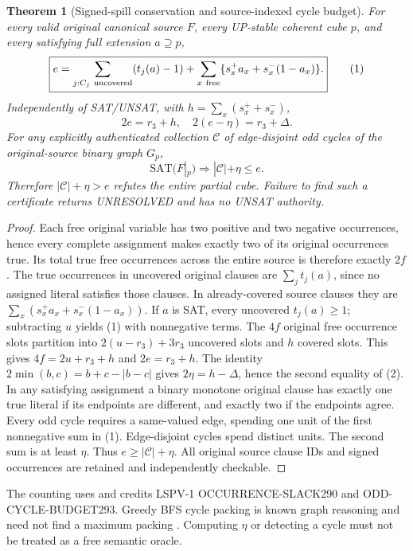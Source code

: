 \documentclass[11pt]{article}
\newtheorem{theorem}{Theorem}
\begin{document}
\begin{theorem}[Signed-spill conservation and source-indexed cycle budget]
For every valid original canonical source $F$, every UP-stable coherent cube $p$, and every satisfying full extension $a\supseteq p$,
\[
\boxed{e=\sum_{j:C_j\ {\rm uncovered}}(t_j(a)-1)
+\sum_{x\ {\rm free}}\{s_x^+a_x+s_x^-(1-a_x)\}.}\tag{1}
\]
Independently of SAT/UNSAT, with $h=\sum_x(s_x^++s_x^-)$,
\[
\boxed{2e=r_3+h,\quad 2(e-\eta)=r_3+\Delta.}\tag{2}
\]
For any explicitly authenticated collection $\mathcal C$ of edge-disjoint odd cycles of the original-source binary graph $G_p$,
\[
\boxed{\mathrm{SAT}(F|_p)\Longrightarrow |\mathcal C|+\eta\le e.}\tag{3}
\]
Therefore $|\mathcal C|+\eta>e$ refutes the entire partial cube. Failure to find such a certificate returns UNRESOLVED and has no UNSAT authority.
\end{theorem}
\begin{proof}
Each free original variable has two positive and two negative occurrences, hence every complete assignment makes exactly two of its original occurrences true. Its total true free occurrences across the entire source is therefore exactly $2f$. The true occurrences in uncovered original clauses are $\sum_j t_j(a)$, since no assigned literal satisfies those clauses. In already-covered source clauses they are $\sum_x(s_x^+a_x+s_x^-(1-a_x))$. If $a$ is SAT, every uncovered $t_j(a)\ge1$; subtracting $u$ yields (1) with nonnegative terms. The $4f$ original free occurrence slots partition into $2(u-r_3)+3r_3$ uncovered slots and $h$ covered slots. This gives $4f=2u+r_3+h$ and $2e=r_3+h$. The identity $2\min(b,c)=b+c-|b-c|$ gives $2\eta=h-\Delta$, hence the second equality of (2). In any satisfying assignment a binary monotone original clause has exactly one true literal if its endpoints are different, and exactly two if the endpoints agree. Every odd cycle requires a same-valued edge, spending one unit of the first nonnegative sum in (1). Edge-disjoint cycles spend distinct units. The second sum is at least $\eta$. Thus $e\ge|\mathcal C|+\eta$. All original source clause IDs and signed occurrences are retained and independently checkable.
\end{proof}
The counting uses and credits LSPV-1 OCCURRENCE-SLACK290 and ODD-CYCLE-BUDGET293. Greedy BFS cycle packing is known graph reasoning and need not find a maximum packing \cite{guo}. Computing $\eta$ or detecting a cycle must not be treated as a free semantic oracle.
\end{document}
